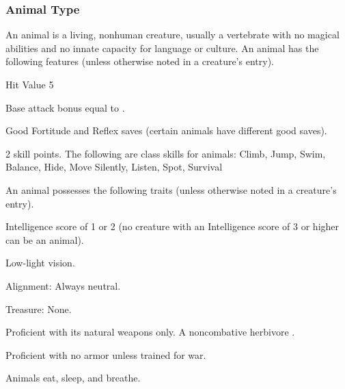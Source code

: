 {\subsubsection{Animal Type} An animal is a living, nonhuman creature, usually a vertebrate with no magical abilities and no innate capacity for language or culture.
 An animal has the following features (unless otherwise noted in a creature's entry).
\begin{itemize*}
\item Hit Value 5
\item Base attack bonus equal to .
\item Good Fortitude and Reflex saves (certain animals have different good saves).
\item 2 skill points. The following are class skills for animals: Climb, Jump, Swim, Balance, Hide, Move Silently, Listen, Spot, Survival
\end{itemize*}
 An animal possesses the following traits (unless otherwise noted in a creature's entry).
\begin{itemize*}
\item Intelligence score of 1 or 2 (no creature with an Intelligence score of 3 or higher can be an animal).
\item Low-light vision.
\item Alignment: Always neutral.
\item Treasure: None.
\item Proficient with its natural weapons only. A noncombative herbivore .
\item Proficient with no armor unless trained for war.
\item Animals eat, sleep, and breathe.
\end{itemize*}

}
